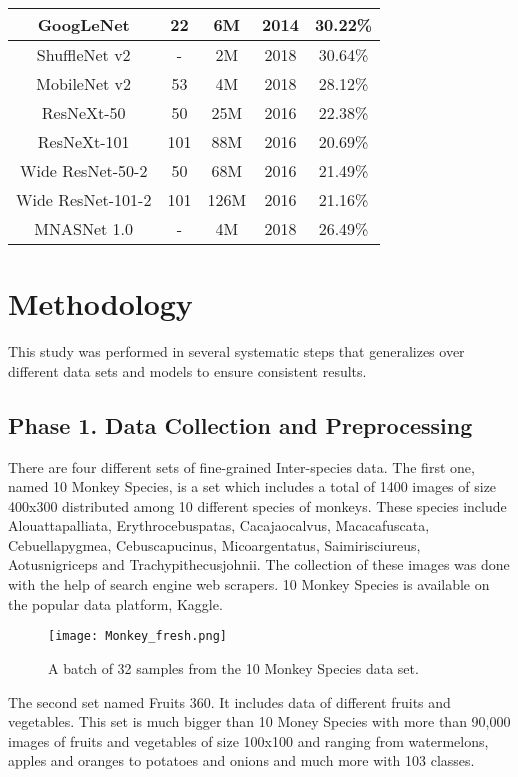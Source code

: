 \documentclass[conference]{IEEEtran}
\begin{document}
\begin{table}
\begin{tabular}{|c|c|c|c|c|}
    \hline GoogLeNet    & 22    & 6M     & 2014  & 30.22\% \\
    \hline ShuffleNet v2 &  -   & 2M     & 2018  & 30.64\% \\
    \hline MobileNet v2  &  53  & 4M     & 2018  & 28.12\% \\
    \hline ResNeXt-50   & 50    & 25M    & 2016  & 22.38\% \\
    \hline ResNeXt-101  & 101   & 88M    & 2016  & 20.69\% \\
    \hline Wide ResNet-50-2 & 50 & 68M   & 2016  & 21.49\% \\
    \hline Wide ResNet-101-2 & 101 & 126M & 2016 & 21.16\% \\
    \hline MNASNet 1.0 & -         & 4M   & 2018 & 26.49\% \\
    \hline
\end{tabular} 
\end{table}



\section{Methodology}
This study was performed in several systematic steps that generalizes over different data sets and models to ensure consistent results.

\subsection{Phase 1. Data Collection and Preprocessing}
There are four different sets of fine-grained Inter-species data. The first one, named 10 Monkey Species\cite{mario2018monkey}, is a set which includes a total of 1400 images of size 400x300 distributed among 10 different species of monkeys. These species include Alouattapalliata, Erythrocebuspatas, Cacajaocalvus, Macacafuscata, Cebuellapygmea, Cebuscapucinus, Micoargentatus, Saimirisciureus, Aotusnigriceps and Trachypithecusjohnii. The collection of these images was done with the help of search engine web scrapers. 10 Monkey Species is available on the popular data platform, Kaggle.

\begin{figure}
  \centering
  \texttt{[image: Monkey\_fresh.png]}
  \caption{A batch of 32 samples from the 10 Monkey Species data set.}
  \label{Mon_N}
\end{figure}

The second set named Fruits 360\cite{murecsan2018fruit}. It includes data of different fruits and vegetables. This set is much bigger than 10 Money Species with more than 90,000 images of fruits and vegetables of size 100x100 and ranging from watermelons, apples and oranges to potatoes and onions and much more with 103 classes. 
\end{document}
